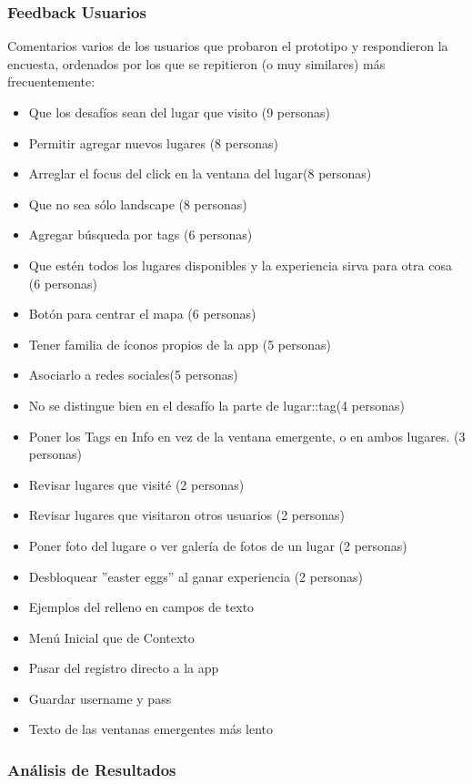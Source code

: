 \documentclass[10pt,letterpaper]{article}
\begin{document}
\subsubsection{Feedback Usuarios}

Comentarios varios de los usuarios que probaron el prototipo y respondieron la encuesta, ordenados por los que se repitieron (o muy similares) más frecuentemente:\\

\begin{itemize}
\item Que los desafíos sean del lugar que visito (9 personas)
\item Permitir agregar nuevos lugares (8 personas)
\item Arreglar el focus del click en la ventana del lugar(8 personas)
\item Que no sea sólo landscape (8 personas)
\item Agregar búsqueda por tags (6 personas)
\item Que estén todos los lugares disponibles y la experiencia sirva para otra cosa (6 personas)
\item Botón para centrar el mapa (6 personas)
\item Tener familia de íconos propios de la app (5 personas)
\item Asociarlo a redes sociales(5 personas)
\item No se distingue bien en el desafío la parte de lugar::tag(4 personas)
\item Poner los Tags en Info en vez de la ventana emergente, o en ambos lugares. (3 personas)
\item Revisar lugares que visité (2 personas)
\item Revisar lugares que visitaron otros usuarios (2 personas)
\item Poner foto del lugare o ver galería de fotos de un lugar (2 personas)
\item Desbloquear ''easter eggs'' al ganar experiencia (2 personas)
\item Ejemplos del relleno en campos de texto
\item Menú Inicial que de Contexto
\item Pasar del registro directo a la app
\item Guardar username y pass
\item Texto de las ventanas emergentes más lento
\end{itemize}

\subsubsection{Análisis de Resultados}
\end{document}
